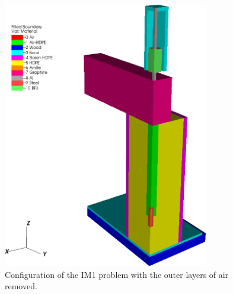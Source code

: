 \begin{figure}
\centering
\includegraphics[width=0.8\textwidth]{figures/sec_DSA/IM1_configuration_Rev1.png}
\caption{Configuration of the IM1 problem with the outer layers of air removed.}
\label{fig::IM1_config}
\end{figure}



